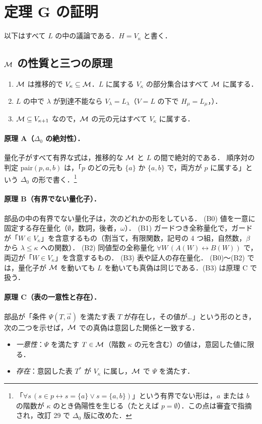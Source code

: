 \section{定理 G の証明}\label{sec:proofG}

以下はすべて $L$ の中の議論である．$H=V_\kappa$ と書く．

\subsection{$\mathcal{M}$ の性質と三つの原理}
\begin{enumerate}[label=(F\arabic*)]
\item $\mathcal{M}$ は推移的で $V_\kappa\subseteq\mathcal{M}$．$L$ に属する $V_\kappa$ の部分集合はすべて $\mathcal{M}$ に属する．
\item $L$ の中で $\lambda$ が到達不能なら $V_\lambda=L_\lambda$（$V{=}L$ の下で $H_\mu=L_\mu$，\cite[13 章]{jech}）．
\item $\mathcal{M}\subseteq V_{\kappa+1}$ なので，$\mathcal{M}$ の元の元はすべて $V_\kappa$ に属する．
\end{enumerate}

\paragraph{原理 A（$\Delta_0$ の絶対性）．}量化子がすべて有界な式は，推移的な $\mathcal{M}$ と $L$ の間で絶対的である．
順序対の判定 $\mathrm{pair}(p,a,b)$ は，「$p$ のどの元も $\{a\}$ か $\{a,b\}$ で，両方が $p$ に属する」という $\Delta_0$ の形で書く．\footnote{「$\forall s\,(s\in p\leftrightarrow s=\{a\}\vee s=\{a,b\})$」という有界でない形は，$a$ または $b$ の階数が $\kappa$ のとき偽陽性を生じる（たとえば $p=\emptyset$）．この点は審査で指摘され，改訂 29 で $\Delta_0$ 版に改めた．}

\paragraph{原理 B（有界でない量化子）．}部品の中の有界でない量化子は，次のどれかの形をしている．
(B0) 値を一意に固定する存在量化（$\emptyset$，数詞，後者，$\omega$）．
(B1) ガードつき全称量化で，ガードが「$W\in V_\kappa$」を含意するもの（割当て，有限関数，記号の 4 つ組，自然数，$\beta$ から $\lambda\le\kappa$ への関数）．
(B2) 同値型の全称量化 $\forall W\,(A(W)\leftrightarrow B(W))$ で，両辺が「$W\in V_\kappa$」を含意するもの．
(B3) 表や証人の存在量化．
(B0)〜(B2) では，量化子が $\mathcal{M}$ を動いても $L$ を動いても真偽は同じである．(B3) は原理 C で扱う．

\paragraph{原理 C（表の一意性と存在）．}部品が「条件 $\Psi(T,\vec a)$ を満たす表 $T$ が存在し，その値が\ldots」という形のとき，次の二つを示せば，$\mathcal{M}$ での真偽は意図した関係と一致する．
\begin{itemize}
\item \emph{一意性}：$\Psi$ を満たす $T\in\mathcal{M}$（階数 $\kappa$ の元を含む）の値は，意図した値に限る．
\item \emph{存在}：意図した表 $T^*$ が $V_\kappa$ に属し，$\mathcal{M}$ で $\Psi$ を満たす．
\end{itemize}


